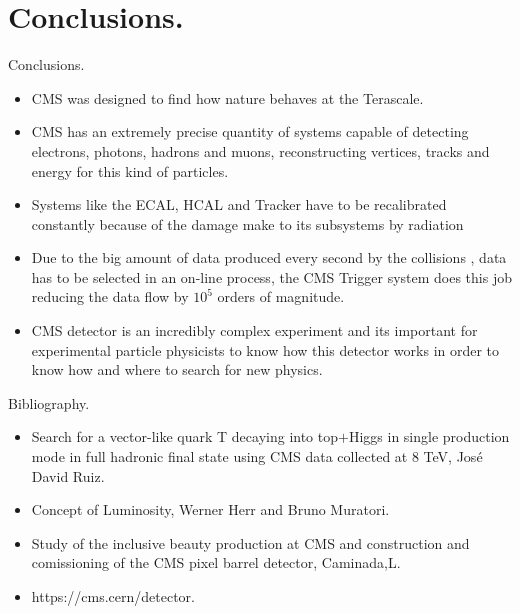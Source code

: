 \documentclass[8pt]{beamer}
\begin{document}
\section{Conclusions.}


\begin{frame}[fragile]{Conclusions.}

		\begin{itemize}
			\item CMS was designed to find how nature behaves at the Terascale.
			\item CMS has an extremely precise quantity of systems capable of detecting electrons, photons, hadrons and muons, reconstructing vertices, tracks and energy for this kind of particles.
			\item Systems like the ECAL, HCAL and Tracker have to be recalibrated constantly because of the damage make to its subsystems by radiation 
			\item Due to the big amount of data produced every second by the collisions , data has to be selected in an on-line process, the CMS Trigger system does this job reducing the data flow by $10^5$ orders of magnitude. 
			\item CMS detector is an incredibly complex experiment and its important for experimental particle physicists to know how this detector works in order to know how and where to search for new physics.
		\end{itemize}
		
		
	
\end{frame}


\begin{frame}[fragile]{Bibliography.}
	
	\begin{itemize}
		\item Search for a vector-like quark T decaying
		into top$+$Higgs in single production mode
		in full hadronic final state using
		CMS data collected at 8 TeV, José David Ruiz.
		
		\item Concept of Luminosity, Werner Herr and Bruno Muratori.
		\item Study of the inclusive beauty production at CMS and construction and comissioning of the CMS pixel barrel detector, Caminada,L.
		\item https://cms.cern/detector.
	\end{itemize}
	
	
	
\end{frame}
\end{document}
